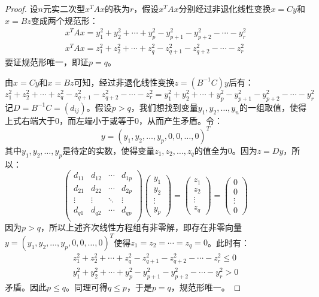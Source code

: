 \begin{proof}
	设$n$元实二次型$x^TAx$的秩为$r$，假设$x^TAx$分别经过非退化线性变换$x=Cy$和$x=Bz$变成两个规范形：
	\begin{gather*}
		x^TAx=y_1^2+y_2^2+\cdots+y_p^2-y_{p+1}^2-y_{p+2}^2-\cdots-y_r^2 \\
		x^TAx=z_1^2+z_2^2+\cdots+z_q^2-z_{q+1}^2-z_{q+2}^2-\cdots-z_r^2
	\end{gather*}
	要证规范形唯一，即证$p=q$。\par
	由$x=Cy$和$x=Bz$可知，经过非退化线性变换$z=(B^{-1}C)y$后有：
	\begin{equation*}
		z_1^2+z_2^2+\cdots+z_q^2-z_{q+1}^2-z_{q+2}^2-\cdots-z_r^2
		=y_1^2+y_2^2+\cdots+y_p^2-y_{p+1}^2-y_{p+2}^2-\cdots-y_r^2
	\end{equation*}
	记$D=B^{-1}C=(d_{ij})$。假设$p>q$，我们想找到变量$y_1,y_2,\dots,y_n$的一组取值，使得上式右端大于$0$，而左端小于或等于$0$，从而产生矛盾。令：
	\begin{equation*}
		y=(y_1,y_2,\dots,y_p,0,0,\dots,0)^T
	\end{equation*}
	其中$y_1,y_2,\dots,y_p$是待定的实数，使得变量$z_1,z_2,\dots,z_q$的值全为$0$。因为$z=Dy$，所以：
	\begin{equation*}
		\begin{pmatrix}
			d_{11} & d_{12} & \cdots & d_{1p} \\
			d_{21} & d_{22} & \cdots & d_{2p} \\
			\vdots & \vdots & \ddots & \vdots \\
			d_{q1} & d_{q2} & \cdots & d_{qp} \\
		\end{pmatrix}
		\begin{pmatrix}
			y_1 \\
			y_2 \\
			\vdots \\
			y_p
		\end{pmatrix}
		=
		\begin{pmatrix}
			z_1 \\
			z_2 \\
			\vdots \\
			z_q
		\end{pmatrix}
		=
		\begin{pmatrix}
			0 \\
			0 \\
			\vdots \\
			0
		\end{pmatrix}
	\end{equation*}
	因为$p>q$，所以上述齐次线性方程组有非零解，即存在非零向量$y=(y_1,y_2,\dots,y_p,0,0,\dots,0)^T$使得$z_1=z_2=\cdots=z_q=0$。此时有：
	\begin{gather*}
		z_1^2+z_2^2+\cdots+z_q^2-z_{q+1}^2-z_{q+2}^2-\cdots-z_r^2\leqslant0 \\
		y_1^2+y_2^2+\cdots+y_p^2-y_{p+1}^2-y_{p+2}^2-\cdots-y_r^2>0
	\end{gather*}
	矛盾。因此$p\leqslant q$。同理可得$q\leqslant p$，于是$p=q$，规范形唯一。
\end{proof}

